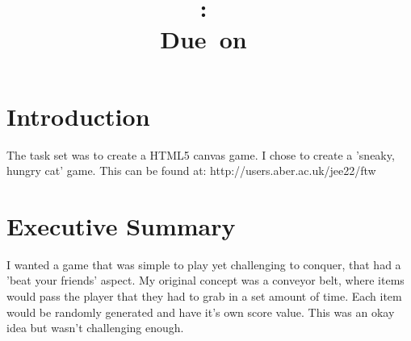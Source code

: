 \documentclass{article}
\title{
\vspace{2in}
\textmd{\textbf{\hmwkClass:\ \hmwkTitle}}\\
\normalsize\vspace{0.1in}\small{Due\ on\ \hmwkDueDate}\\
\vspace{3in}
}
\author{\textbf{\hmwkAuthorName}}
\date{} %
\begin{document}
\maketitle



\newpage
\tableofcontents
\newpage



\section{Introduction}
The task set\cite{assignment} was to create a HTML5 canvas game. I chose to create a 'sneaky, hungry cat' game. This can be found at: http://users.aber.ac.uk/jee22/ftw



\section{Executive Summary}
I wanted a game that was simple to play yet challenging to conquer, that had a 'beat your friends' aspect. My original concept was a conveyor belt, where items would pass the player that they had to grab in a set amount of time. Each item would be randomly generated and have it's own score value. This was an okay idea but wasn't challenging enough. 
\end{document}
